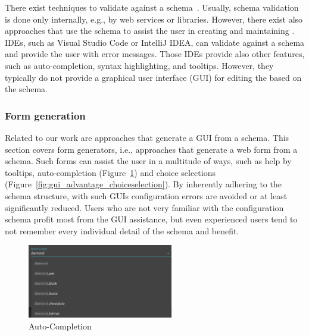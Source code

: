 There exist techniques to validate \cfgfiles{} against a schema~\cite{JSON_schema_vailidation,JSONValidation,baeldung_2023}.
Usually, schema validation is done only internally, e.g., by web services or libraries.
However, there exist also approaches that use the schema to assist the user in creating and maintaining \cfgfiles.
IDEs, such as Visual Studio Code or IntelliJ IDEA, can validate \cfgfiles{} against a schema and provide the user with error messages.
Those IDEs provide also other features, such as auto-completion, syntax highlighting, and tooltips.
However, they typically do not provide a graphical user interface (GUI) for editing the \cfgfiles{} based on the schema.


\subsubsection{Form generation}\label{subsubsec:schema-to-gui}

Related to our work are approaches that generate a GUI from a schema.
This section covers form generators, i.e., approaches that generate a web form from a schema.
Such forms can assist the user in a multitude of ways, such as help by tooltips, auto-completion (Figure~\ref{fig:gui_advantage_autocomplete}) and choice selections (Figure~\ref{fig:gui_advantage_choiceselection}).
By inherently adhering to the schema structure, with such GUIs configuration errors are avoided or at least significantly reduced.
Users who are not very familiar with the configuration schema profit most from the GUI assistance, but even experienced users tend to not remember every individual detail of the schema and benefit.

\begin{figure}[htb]
\centering
\includegraphics[width=2.5in]{figures/gui_advantage_autocomplete}
\caption{Auto-Completion}
\label{fig:gui_advantage_autocomplete}
\end{figure}

